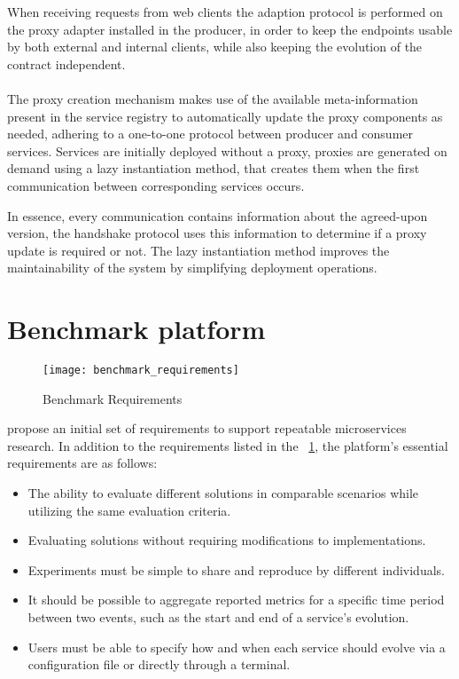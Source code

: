 When receiving requests from web clients the adaption protocol is performed on the proxy adapter installed in the producer,
in order to keep the endpoints usable by both external and internal clients, while also keeping the evolution of the contract independent.

\paragraph{}

The proxy creation mechanism makes use of the available meta-information present in the service registry
to automatically update the proxy components as needed, adhering to a one-to-one protocol between producer and consumer services.
Services are initially deployed without a proxy, proxies are generated on demand using a lazy instantiation method,
that creates them when the first communication between corresponding services occurs.

In essence, every communication contains information about the agreed-upon version, the handshake protocol uses this information to determine if a proxy update is required or not.
The lazy instantiation method improves the maintainability of the system by
simplifying deployment operations.

\section{Benchmark platform} %
\label{sec:benchmark_platform}

\begin{figure}[htbp]
    \centering
    \texttt{[image: benchmark\_requirements]}
    \caption{Benchmark Requirements \cite{microservices2017benchmark}}
    \label{fig:benchmark}
\end{figure}

\citeauthor{microservices2017benchmark} propose an initial set of requirements
to support repeatable microservices research.
In addition to the requirements listed in the ~\ref{fig:benchmark}, the platform's essential requirements are as follows:
\begin{itemize}
    \item The ability to evaluate different solutions in comparable scenarios while utilizing the same evaluation criteria.
    \item Evaluating solutions without requiring modifications to implementations.
    \item Experiments must be simple to share and reproduce by different individuals.
    \item It should be possible to aggregate reported metrics for a specific time period between two events, such as the start and end of a service's evolution.
    \item Users must be able to specify how and when each service should evolve via a configuration file or directly through a terminal.
\end{itemize}

